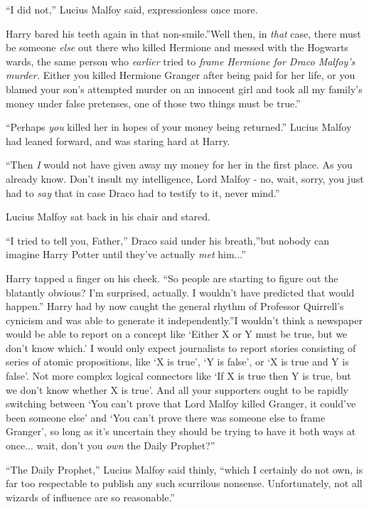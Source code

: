 ``I did not,'' Lucius Malfoy said, expressionless once more.

Harry bared his teeth again in that non-smile.''Well then, in
\emph{that} case, there must be someone \emph{else} out there who killed
Hermione and messed with the Hogwarts wards, the same person who
\emph{earlier} tried to \emph{frame Hermione for Draco Malfoy's murder.}
Either you killed Hermione Granger after being paid for her life, or you
blamed your son's attempted murder on an innocent girl and took all my
family's money under false pretenses, one of those two things must be
true.''

``Perhaps \emph{you} killed her in hopes of your money being returned.''
Lucius Malfoy had leaned forward, and was staring hard at Harry.

``Then \emph{I} would not have given away my money for her in the first
place. As you already know. Don't insult my intelligence, Lord Malfoy -
no, wait, sorry, you just had to \emph{say} that in case Draco had to
testify to it, never mind.''

Lucius Malfoy sat back in his chair and stared.

``I tried to tell you, Father,'' Draco said under his breath,''but
nobody can imagine Harry Potter until they've actually \emph{met}
him...''

Harry tapped a finger on his cheek. ``So people are starting to figure
out the blatantly obvious? I'm surprised, actually. I wouldn't have
predicted that would happen.'' Harry had by now caught the general
rhythm of Professor Quirrell's cynicism and was able to generate it
independently.''I wouldn't think a newspaper would be able to report on
a concept like `Either X or Y must be true, but we don't know which.' I
would only expect journalists to report stories consisting of series of
atomic propositions, like `X is true', `Y is false', or `X is true and Y
is false'. Not more complex logical connectors like `If X is true then Y
is true, but we don't know whether X is true'. And all your supporters
ought to be rapidly switching between `You can't prove that Lord Malfoy
killed Granger, it could've been someone else' and `You can't prove
there was someone else to frame Granger', so long as it's uncertain they
should be trying to have it both ways at once... wait, don't you
\emph{own} the Daily Prophet?''

``The Daily Prophet,'' Lucius Malfoy said thinly, ``which I certainly do
not own, is far too respectable to publish any such scurrilous nonsense.
Unfortunately, not all wizards of influence are so reasonable.''

